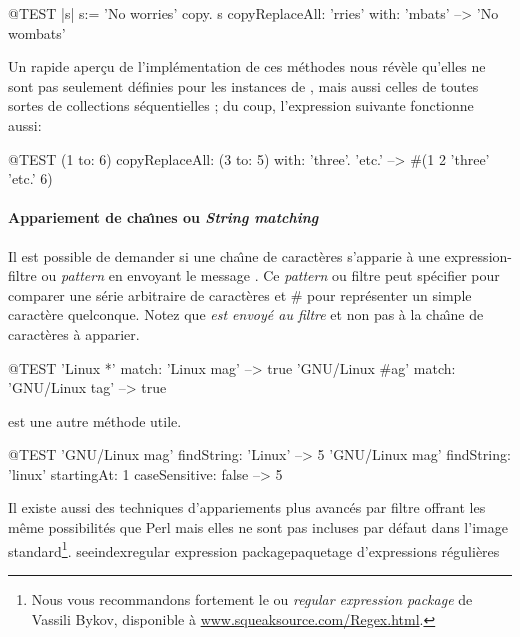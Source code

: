 \documentclass[a4paper,10pt,twoside]{book}
\begin{document}
\begin{code}{@TEST |s| s:= 'No worries' copy.}
s copyReplaceAll: 'rries' with: 'mbats' --> 'No wombats'
\end{code}

Un rapide aper\c{c}u de l'impl\'ementation de ces m\'ethodes nous r\'ev\`ele
qu'elles ne sont pas seulement d\'efinies pour les instances de
, mais aussi celles de toutes sortes de collections 
s\'equentielles ; du coup, l'expression suivante
fonctionne aussi:

\begin{code}{@TEST}
(1 to: 6) copyReplaceAll: (3 to: 5) with: { 'three'. 'etc.' } --> #(1 2 'three' 'etc.' 6)
\end{code}

\paragraph{Appariement de cha\^{\i}nes ou \emph{String matching}}

Il est possible de demander si une cha\^{\i}ne de caract\`eres
s'apparie \`a  une expression-filtre ou \emph{pattern} en
envoyant le message .
Ce \emph{pattern} ou filtre peut sp\'ecifier \ct{*} pour
comparer une s\'erie arbitraire de caract\`eres et \# 
pour repr\'esenter un simple caract\`ere quelconque.
Notez que \emph{ est envoy\'e au filtre} et non pas \`a la cha\^{\i}ne
de caract\`eres \`a apparier.
\begin{code}{@TEST}
'Linux *' match: 'Linux mag'                      --> true
'GNU/Linux #ag' match: 'GNU/Linux tag' --> true
\end{code}

 est une autre m\'ethode utile.
\begin{code}{@TEST}
'GNU/Linux mag' findString: 'Linux'                                                      --> 5
'GNU/Linux mag' findString: 'linux' startingAt: 1 caseSensitive: false  --> 5
\end{code}

Il existe aussi des techniques d'appariements plus avanc\'es par filtre 
offrant les m\^eme possibilit\'es que Perl mais elles ne sont pas incluses
par d\'efaut dans l'image standard\footnote{Nous vous recommandons fortement
le  ou \emph{regular expression package} de Vassili Bykov, disponible \`a \url{www.squeaksource.com/Regex.html}.
}.
seeindex{regular expression package}{paquetage d'expressions r\'eguli\`eres}
\end{document}
